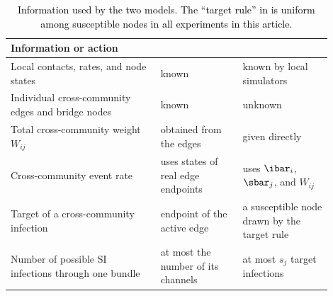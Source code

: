 \begin{table}[tbp]
\color{black}
\centering
\caption{\textcolor{black}{Information used by the two models. The ``target rule'' in \TS{} is uniform among susceptible nodes in all experiments in this article.}}
\label{tab:information}
\small
\begin{tabular}{>{\raggedright\arraybackslash}p{0.42\linewidth}>{\raggedright\arraybackslash}p{0.23\linewidth}>{\raggedright\arraybackslash}p{0.25\linewidth}}
\toprule
Information or action & \Full{} & \TS{}\\
\midrule
Local contacts, rates, and node states & known & known by local simulators\\
Individual cross-community edges and bridge nodes & known & unknown\\
Total cross-community weight $W_{ij}$ & obtained from the edges & given directly\\
Cross-community event rate & uses states of real edge endpoints & uses $\ibar_i$, $\sbar_j$, and $W_{ij}$\\
Target of a cross-community infection & endpoint of the active edge & a susceptible node drawn by the target rule\\
Number of possible SI infections through one bundle & at most the number of its channels & at most $s_j$ target infections\\
\bottomrule
\end{tabular}
\end{table}

